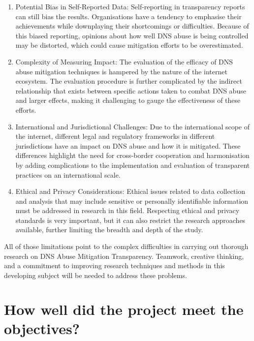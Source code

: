 \begin{enumerate}
    \item Potential Bias in Self-Reported Data: Self-reporting in transparency reports can still bias the results. Organisations have a tendency to emphasise their achievements while downplaying their shortcomings or difficulties. Because of this biased reporting, opinions about how well DNS abuse is being controlled may be distorted, which could cause mitigation efforts to be overestimated.
    
    \item Complexity of Measuring Impact: The evaluation of the efficacy of DNS abuse mitigation techniques is hampered by the nature of the internet ecosystem. The evaluation procedure is further complicated by the indirect relationship that exists between specific actions taken to combat DNS abuse and larger effects, making it challenging to gauge the effectiveness of these efforts.

    \item International and Jurisdictional Challenges: Due to the international scope of the internet, different legal and regulatory frameworks in different jurisdictions have an impact on DNS abuse and how it is mitigated. These differences highlight the need for cross-border cooperation and harmonisation by adding complications to the implementation and evaluation of transparent practices on an international scale.

    \item Ethical and Privacy Considerations: Ethical issues related to data collection and analysis that may include sensitive or personally identifiable information must be addressed in research in this field. Respecting ethical and privacy standards is very important, but it can also restrict the research approaches available, further limiting the breadth and depth of the study.

    
  
\end{enumerate}

All of those limitations point to the complex difficulties in carrying out thorough research on DNS Abuse Mitigation Transparency. Teamwork, creative thinking, and a commitment to improving research techniques and methods in this developing subject will be needed to address these problems.

\section{How well did the project meet the objectives?}

